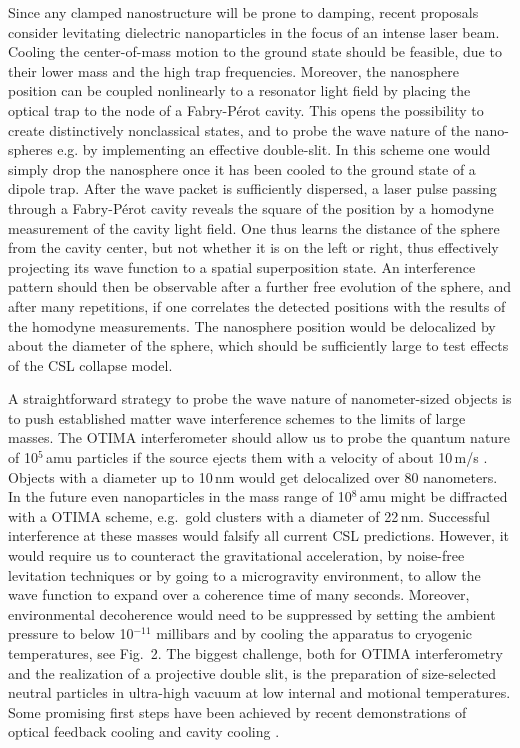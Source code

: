 \documentclass[11pt]{article}
\begin{document}
Since any clamped nanostructure will be prone to damping, recent proposals \cite{Chang2010,Romero-Isart2010,PhysRevA.81.023826} consider levitating dielectric nanoparticles in the focus of an intense laser beam.  
Cooling the center-of-mass motion to the ground state should be feasible, due to their lower mass and the high trap frequencies.
Moreover, the nanosphere position can be coupled nonlinearly to
a resonator light field by placing the optical trap to the node of a Fabry-P{\'e}rot cavity. This opens the possibility to create distinctively nonclassical states, and to probe the wave nature of the nano-spheres e.g. by implementing an effective double-slit\cite{Romero-Isart2011b}.
In this scheme one would simply drop the nanosphere once it has been cooled to the ground state of a dipole trap. After the wave packet is sufficiently dispersed, a laser pulse passing through a Fabry-P{\'e}rot cavity reveals the square of the position by a homodyne measurement of the cavity light field. One thus learns the distance of the sphere from the cavity center, but not whether it is on the left or right, thus effectively projecting its wave function to a spatial superposition state. An interference pattern should then be observable after a further free evolution of the sphere,  and after many repetitions, if one correlates the detected positions with the results of the homodyne measurements.
The nanosphere position would be delocalized by about the diameter of the sphere, which should be sufficiently large to test effects of the CSL collapse model.

A straightforward strategy to probe the wave nature of nanometer-sized objects is to push established matter wave interference schemes to the limits of large masses. The OTIMA interferometer should allow us to probe the quantum nature of  10$^{5}$\,amu particles if the source ejects them with  a velocity of about 10\,m/s \cite{Nimmrichter2011b}. Objects with a diameter up to 10\,nm would get delocalized over 80 nanometers. 
In the future even nanoparticles in the mass range of 10$^{8}$\,amu might be diffracted with a OTIMA scheme, e.g.\ gold clusters with a diameter of 22\,nm.  Successful interference  at these masses would falsify all current CSL predictions\cite{Nimmrichter2011a_PRA_long}.
However, it would require us to counteract the gravitational acceleration, by noise-free levitation techniques or by going to a microgravity environment,
to allow the wave function to expand over a coherence time of many seconds.
Moreover, environmental decoherence would need to be suppressed by setting the ambient pressure to below 10$^{-11}$ millibars and by cooling the apparatus to cryogenic temperatures\cite{Hornberger2012RMP}, see Fig.~2. The biggest challenge, both for OTIMA interferometry and the realization of a projective double slit, is the preparation of size-selected neutral particles in ultra-high vacuum at low internal and motional temperatures.
Some promising  first steps have been achieved by recent demonstrations of optical feedback cooling \cite{Li2011,Gieseler2012} and cavity cooling \cite{kiesel2013cavity, asenbaum2013cavity}.
\end{document}
